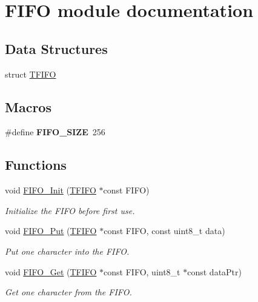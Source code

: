 \hypertarget{group___f_i_f_o__module}{}\section{F\+I\+F\+O module documentation}
\label{group___f_i_f_o__module}
\subsection*{Data Structures}
\begin{DoxyCompactItemize}
\item 
struct \hyperlink{struct_t_f_i_f_o}{T\+F\+I\+F\+O}
\end{DoxyCompactItemize}
\subsection*{Macros}
\begin{DoxyCompactItemize}
\item 
\hypertarget{group___f_i_f_o__module_ga6092455278a1ac67204e0dbe08f9d13f}{}\#define {\bfseries F\+I\+F\+O\+\_\+\+S\+I\+Z\+E}~256\label{group___f_i_f_o__module_ga6092455278a1ac67204e0dbe08f9d13f}

\end{DoxyCompactItemize}
\subsection*{Functions}
\begin{DoxyCompactItemize}
\item 
void \hyperlink{group___f_i_f_o__module_gad9207f49ab9ed061b6dca6063112ca60}{F\+I\+F\+O\+\_\+\+Init} (\hyperlink{struct_t_f_i_f_o}{T\+F\+I\+F\+O} $\ast$const F\+I\+F\+O)
\begin{DoxyCompactList}\small\item\em Initialize the F\+I\+F\+O before first use. \end{DoxyCompactList}\item 
void \hyperlink{group___f_i_f_o__module_gaee681f1a1e1fd5672ed23dca0929433a}{F\+I\+F\+O\+\_\+\+Put} (\hyperlink{struct_t_f_i_f_o}{T\+F\+I\+F\+O} $\ast$const F\+I\+F\+O, const uint8\+\_\+t data)
\begin{DoxyCompactList}\small\item\em Put one character into the F\+I\+F\+O. \end{DoxyCompactList}\item 
void \hyperlink{group___f_i_f_o__module_gabb3392ae9e1170a724586695ab0e5808}{F\+I\+F\+O\+\_\+\+Get} (\hyperlink{struct_t_f_i_f_o}{T\+F\+I\+F\+O} $\ast$const F\+I\+F\+O, uint8\+\_\+t $\ast$const data\+Ptr)
\begin{DoxyCompactList}\small\item\em Get one character from the F\+I\+F\+O. \end{DoxyCompactList}\end{DoxyCompactItemize}


